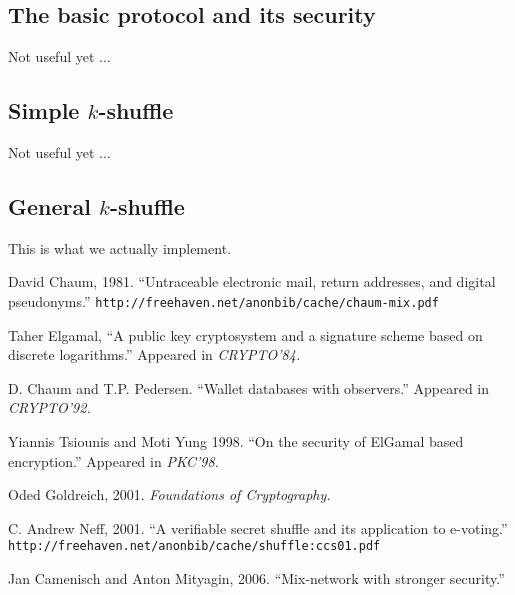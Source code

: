 \documentclass[letter]{article}
\begin{document}
\subsection{The basic protocol and its security}
Not useful yet ...

\subsection{Simple $k$-shuffle}
Not useful yet ...

\subsection{General $k$-shuffle}
This is what we actually implement.


\begin{thebibliography}{99}

   David Chaum, 1981. ``Untraceable electronic mail, return addresses, and digital pseudonyms.''
    {\tt http://freehaven.net/anonbib/cache/chaum-mix.pdf}

   Taher Elgamal, ``A public key cryptosystem and a signature
    scheme based on discrete logarithms.'' Appeared in \textit{CRYPTO'84.}

    D. Chaum and T.P. Pedersen. ``Wallet databases with
    observers.'' Appeared in \textit{CRYPTO'92.}

   Yiannis Tsiounis and Moti Yung 1998. ``On the security of
    ElGamal based encryption.'' Appeared in \textit{PKC'98.}

   Oded Goldreich, 2001. \textit{Foundations of Cryptography.}

   C. Andrew Neff, 2001. ``A verifiable secret shuffle and its application to e-voting.'' {\tt http://freehaven.net/anonbib/cache/shuffle:ccs01.pdf}

   Jan Camenisch and Anton Mityagin, 2006. ``Mix-network with
    stronger security.''

\end{thebibliography}
\end{document}

